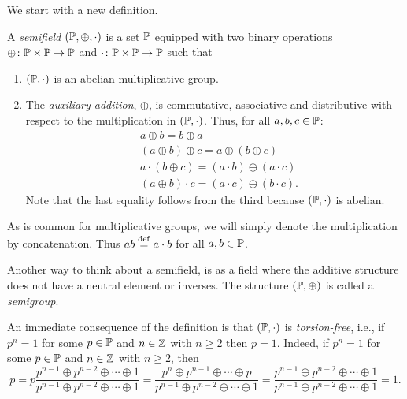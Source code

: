 \medskip

We start with a new definition.
\begin{definition}

	A \emph{semifield} $(\mathbb{P}, \oplus, \cdot)$ is a set
	$\mathbb{P}$ equipped with two binary operations $\oplus \colon \mathbb{P} \times
		\mathbb{P} \to \mathbb{P}$ and $\cdot \colon \mathbb{P} \times \mathbb{P} \to \mathbb{P}$ such that
	\begin{enumerate}
		\item $(\mathbb{P}, \cdot)$ is an abelian multiplicative group.
		\item The \emph{auxiliary addition}, $\oplus$, is commutative,
		      associative and distributive with respect to the multiplication in $(\mathbb{P}, \cdot)$.
		      Thus, for all $a,b,c \in \mathbb{P}$:
		      \begin{align*}
			       & a \oplus b = b \oplus a                                \\
			       & (a \oplus b) \oplus c =  a \oplus (b \oplus c)         \\
			       & a \cdot (b \oplus c) = (a \cdot b) \oplus (a \cdot c)  \\
			       & (a \oplus b) \cdot c = (a \cdot c) \oplus (b \cdot c).
		      \end{align*}
		      Note that the last equality follows from the third because $(\mathbb{P}, \cdot)$ is abelian.
	\end{enumerate}
	As is common for multiplicative groups, we will simply denote the multiplication by
	concatenation. Thus $ab \overset{\mathrm{def}}{=} a \cdot b$ for all $a, b \in \mathbb{P}$.
\end{definition}

Another way to think about a semifield, is as a field where the additive structure does
not have a neutral element or inverses. The structure $(\mathbb{P}, \oplus)$ is called a
\emph{semigroup}.

An immediate consequence of the definition is that $(\mathbb{P}, \cdot)$ is
\emph{torsion-free}, i.e., if $p^n = 1$ for some $p\in \mathbb{P}$
and $n \in \mathbb{Z}$ with $n\geq 2$ then $p = 1$. Indeed, if $p^n = 1$ for some $p \in
	\mathbb{P}$ and $n \in \mathbb{Z}$ with $n \geq 2$, then
\begin{equation*}
	p
	= p \frac{p^{n-1} \oplus p^{n-2} \oplus \cdots \oplus 1}{ p^{n-1} \oplus p^{n-2} \oplus \cdots \oplus 1}
	= \frac{p^n \oplus p^{n-1} \oplus \cdots \oplus p}{ p^{n-1} \oplus p^{n-2} \oplus \cdots \oplus 1}
	= \frac{p^{n-1} \oplus p^{n-2} \oplus \cdots \oplus 1}{ p^{n-1} \oplus p^{n-2} \oplus \cdots \oplus 1}
	=1.
\end{equation*}

